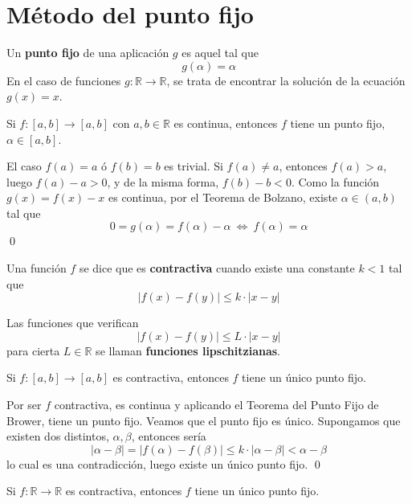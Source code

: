    \section{M{\'e}todo del punto fijo}
       \begin{defin}
           Un \textbf{punto fijo} de una aplicación
           $g$ es aquel tal que $$g(\alpha)=\alpha$$
           En el caso de funciones $g: \mathbb{R} \longrightarrow \mathbb{R}$, se trata de encontrar la solución de la ecuación $g(x)=x$.
       \end{defin}
       \begin{teo} Si $f: [a,b] \longrightarrow [a,b]$ con $a,b \in \mathbb{R}$ es continua, entonces $f$ tiene un punto fijo, $\alpha\in[a,b]$.
       \end{teo}
       \begin{dem}
           El caso $f(a)=a$ ó $f(b)=b$ es trivial. Si $f(a)\neq a$, entonces $f(a)>a$, luego $f(a)-a>0$, y de la misma forma, $f(b)-b <0$. Como la función $g(x)=f(x)-x$ es continua, por el Teorema de Bolzano, existe $\alpha \in (a,b)$ tal que $$0=g(\alpha)=f(\alpha)-\alpha \: \iff \: f(\alpha)=\alpha$$ 
       \qed\end{dem}
       \begin{defin}
           Una función $f$ se dice que es \textbf{contractiva} cuando existe una constante $k < 1$ tal que
           $$|f(x)-f(y)| \leq k \cdot |x-y|$$
       \end{defin}
       \begin{defin}
       Las funciones que verifican $$|f(x)-f(y)|\leq L \cdot |x-y|$$ para cierta $L \in \mathbb{R}$ se llaman \textbf{funciones lipschitzianas}.
       \end{defin}
       \begin{teo}  Si $f: [a,b] \longrightarrow [a,b]$ es contractiva, entonces $f$ tiene un único punto fijo. 
       \end{teo}
       \begin{dem}
           Por ser $f$ contractiva, es continua y aplicando el Teorema del Punto Fijo de Brower, tiene un punto fijo. Veamos que el punto fijo es único. Supongamos que existen dos distintos, $\alpha, \beta$, entonces sería
           $$|\alpha-\beta|=|f(\alpha)-f(\beta)| \leq k \cdot |\alpha-\beta| < \alpha-\beta$$
           lo cual es una contradicción, luego existe un único punto fijo.
       \qed\end{dem}
       \begin{ejer}
       Si $f: \mathbb{R} \longrightarrow \mathbb{R}$ es contractiva, entonces $f$ tiene un único punto fijo.
       \end{ejer}
